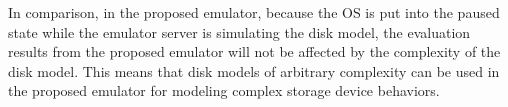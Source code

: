 In comparison, in the proposed emulator, because the OS is put into the paused state while the emulator server is simulating the disk model, the evaluation results from the proposed emulator will not be affected by the complexity of the disk model. This means that disk models of arbitrary complexity can be used in the proposed emulator for modeling complex storage device behaviors.